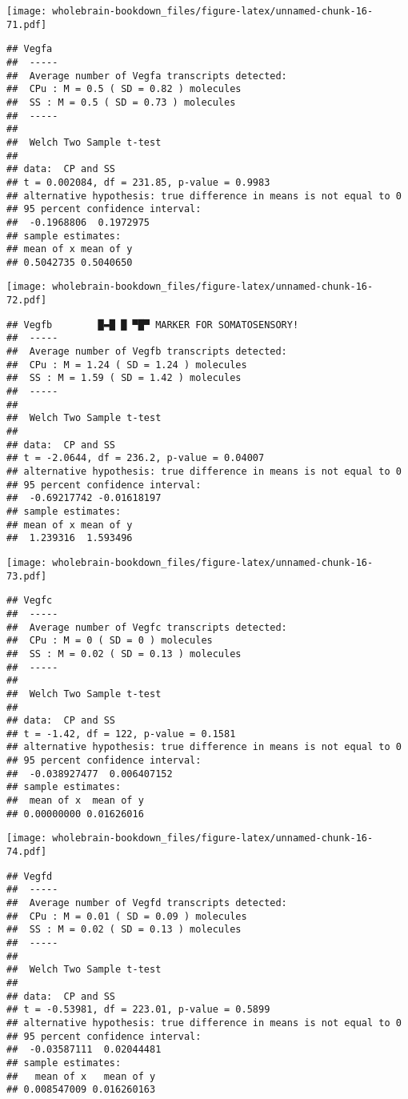\documentclass[]{book}
\theoremstyle{definition}
\theoremstyle{definition}
\theoremstyle{remark}
\begin{document}
\texttt{[image: wholebrain-bookdown\_files/figure-latex/unnamed-chunk-16-71.pdf]}

\begin{verbatim}
## Vegfa
##  -----
##  Average number of Vegfa transcripts detected:
##  CPu : M = 0.5 ( SD = 0.82 ) molecules 
##  SS : M = 0.5 ( SD = 0.73 ) molecules
##  -----
## 
##  Welch Two Sample t-test
## 
## data:  CP and SS
## t = 0.002084, df = 231.85, p-value = 0.9983
## alternative hypothesis: true difference in means is not equal to 0
## 95 percent confidence interval:
##  -0.1968806  0.1972975
## sample estimates:
## mean of x mean of y 
## 0.5042735 0.5040650
\end{verbatim}

\texttt{[image: wholebrain-bookdown\_files/figure-latex/unnamed-chunk-16-72.pdf]}

\begin{verbatim}
## Vegfb        █▬█ █ ▀█▀ MARKER FOR SOMATOSENSORY!
##  -----
##  Average number of Vegfb transcripts detected:
##  CPu : M = 1.24 ( SD = 1.24 ) molecules 
##  SS : M = 1.59 ( SD = 1.42 ) molecules
##  -----
## 
##  Welch Two Sample t-test
## 
## data:  CP and SS
## t = -2.0644, df = 236.2, p-value = 0.04007
## alternative hypothesis: true difference in means is not equal to 0
## 95 percent confidence interval:
##  -0.69217742 -0.01618197
## sample estimates:
## mean of x mean of y 
##  1.239316  1.593496
\end{verbatim}

\texttt{[image: wholebrain-bookdown\_files/figure-latex/unnamed-chunk-16-73.pdf]}

\begin{verbatim}
## Vegfc
##  -----
##  Average number of Vegfc transcripts detected:
##  CPu : M = 0 ( SD = 0 ) molecules 
##  SS : M = 0.02 ( SD = 0.13 ) molecules
##  -----
## 
##  Welch Two Sample t-test
## 
## data:  CP and SS
## t = -1.42, df = 122, p-value = 0.1581
## alternative hypothesis: true difference in means is not equal to 0
## 95 percent confidence interval:
##  -0.038927477  0.006407152
## sample estimates:
##  mean of x  mean of y 
## 0.00000000 0.01626016
\end{verbatim}

\texttt{[image: wholebrain-bookdown\_files/figure-latex/unnamed-chunk-16-74.pdf]}

\begin{verbatim}
## Vegfd
##  -----
##  Average number of Vegfd transcripts detected:
##  CPu : M = 0.01 ( SD = 0.09 ) molecules 
##  SS : M = 0.02 ( SD = 0.13 ) molecules
##  -----
## 
##  Welch Two Sample t-test
## 
## data:  CP and SS
## t = -0.53981, df = 223.01, p-value = 0.5899
## alternative hypothesis: true difference in means is not equal to 0
## 95 percent confidence interval:
##  -0.03587111  0.02044481
## sample estimates:
##   mean of x   mean of y 
## 0.008547009 0.016260163
\end{verbatim}
\end{document}
